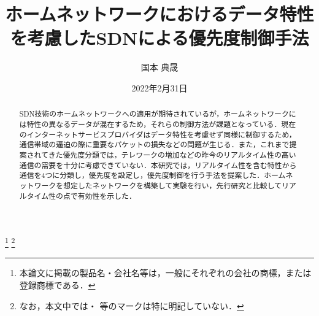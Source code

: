 \documentclass[a4paper,11pt,uplatex]{ujreport}
\title{ホームネットワークにおけるデータ特性を考慮したSDNによる優先度制御手法}  %
\author{国本 典晟}  %
\date{2022年2月31日}  %
\begin{document}
\maketitle
\clearpage

\begin{abstract}

  SDN技術のホームネットワークへの適用が期待されているが，ホームネットワークには特性の異なるデータが混在するため，それらの制御方法が課題となっている．現在のインターネットサービスプロバイダはデータ特性を考慮せず同様に制御するため，通信帯域の逼迫の際に重要なパケットの損失などの問題が生じる．また，これまで提案されてきた優先度分類では，テレワークの増加などの昨今のリアルタイム性の高い通信の需要を十分に考慮できていない．本研究では，リアルタイム性を含む特性から通信を4つに分類し，優先度を設定し，優先度制御を行う手法を提案した．ホームネットワークを想定したネットワークを構築して実験を行い，先行研究と比較してリアルタイム性の点で有効性を示した．

\end{abstract}


\footnote[0]{本論文に掲載の製品名・会社名等は，一般にそれぞれの会社の商標，または登録商標である．}
\footnote[0]{なお，本文中では\texttrademark ・ \textregistered 等のマークは特に明記していない．}


\setcounter{page}{0}
\end{document}
